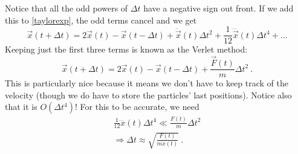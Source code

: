 \documentclass[11pt]{article}
\def\be{\begin{equation}}
\def\ee{\end{equation}}
\renewcommand\({\left(}
\renewcommand\){\right)}
\renewcommand\[{\left[}
\renewcommand\]{\right]}
\def\be{\begin{equation}}
\def\ee{\end{equation}}
\begin{document}
Notice that all the odd powers of $\Delta t$ have a negative sign out front.  If we add this to \ref{taylorexp}, the odd terms cancel and we get
%
\be
\vec x( t + \Delta t ) = 2 \vec x(t) - \vec x( t - \Delta t )   +  \ddot{ \vec x}(t) \Delta t^2 +  \frac{1}{12}\ddddot{ \vec x}(t) \Delta t^4 + ...
 \label{taylorexp}
\ee
%
Keeping just the first three terms is known as the Verlet method:
\be
\vec x( t + \Delta t ) = 2 \vec x(t) - \vec x( t - \Delta t )   + \frac{\vec F(t)}{m} \Delta t^2~.
 \label{Verlet}
\ee
This is particularly nice because it means we don't have to keep track of the velocity (though we do have to store the particles' last positions).  Notice also that it is $O(\Delta t^4)$!  For this to be accurate, we need
\begin{align}
\frac{1}{12}\ddddot{ x}(t) \Delta t^4 \ll \frac{ F(t)}{m} \Delta t^2 \\
\Rightarrow \Delta t \approx \sqrt{ \frac{ F(t) }{m \ddddot{ x}(t)} }~.
\end{align}



\end{document}
